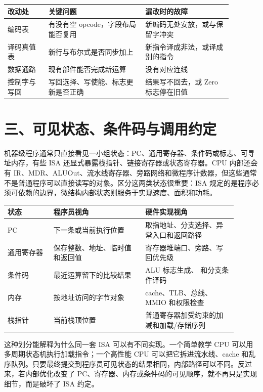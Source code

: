 \begin{longtable}{L{0.16\linewidth}L{0.38\linewidth}L{0.34\linewidth}}
\toprule
改动处 & 关键问题 & 漏改时的故障 \\
\midrule
编码表 & 有没有空 opcode，字段布局能否复用 & 新编码无处安放，或与保留字冲突 \\
译码真值表 & 新行与布尔式是否同步加上 & 新指令译成非法，或译成别的指令 \\
数据通路 & 现有部件能否完成新运算 &  没有对应连线 \\
控制字与写回 & 写回选择、写使能、标志更新是否正确 & 结果写不回去，或 Zero 标志停在旧值 \\
\bottomrule
\end{longtable}

\section{三、可见状态、条件码与调用约定}

机器级程序通常只直接看见一小组状态：PC、通用寄存器、条件码或标志、可寻址内存，有些 ISA 还显式暴露栈指针、链接寄存器或状态寄存器。CPU 内部还会有 IR、MDR、ALUOut、流水线寄存器、旁路网络和微程序计数器，但这些通常不是普通程序可以直接读写的对象。区分这两类状态很重要：ISA 规定的是程序必须可依赖的边界，微结构内部状态则服务于实现速度、面积和功耗。

\begin{longtable}{L{0.18\linewidth}L{0.36\linewidth}L{0.36\linewidth}}
\toprule
状态 & 程序员视角 & 硬件实现视角 \\
\midrule
PC & 下一条或当前执行位置 & 取指地址、分支选择、异常入口和返回路径 \\
通用寄存器 & 保存整数、地址、临时值和返回值 & 寄存器堆端口、旁路、写回优先级 \\
条件码 & 最近运算留下的比较结果 & ALU 标志生成、 和分支条件译码 \\
内存 & 按地址访问的字节对象 & cache、TLB、总线、MMIO 和权限检查 \\
栈指针 & 当前栈顶位置 & 普通寄存器加受约束的加减和加载/存储序列 \\
\bottomrule
\end{longtable}

这种划分能解释为什么同一套 ISA 可以有不同实现。一个简单教学 CPU 可以用多周期状态机执行加载指令；一个高性能 CPU 可以把它拆进流水线、cache 和乱序队列。只要最终提交到程序员可见状态的结果相同，内部路径可以不同。反过来，若内部优化改变了 PC、寄存器、内存或条件码的可见顺序，就不再只是实现细节，而是破坏了 ISA 约定。

